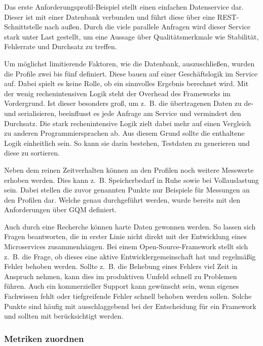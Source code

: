 Das erste Anforderungsprofil-Beispiel stellt einen einfachen Datenservice dar. Dieser ist mit einer Datenbank verbunden und führt diese über eine \ac{REST}-Schnittstelle nach außen. Durch die viele parallele Anfragen wird dieser Service stark unter Last gestellt, um eine Aussage über Qualitätsmerkmale wie Stabilität, Fehlerrate und Durchsatz zu treffen.

Um möglichst limitierende Faktoren, wie die Datenbank, auszuschließen, wurden die Profile zwei bis fünf definiert. Diese bauen auf einer Geschäftslogik im Service auf. Dabei spielt es keine Rolle, ob ein sinnvolles Ergebnis berechnet wird. Mit der wenig rechenintensiven Logik steht der Overhead des Frameworks im Vordergrund. Ist dieser besonders groß, um z.~B. die übertragenen Daten zu de- und serialisieren, beeinflusst es jede Anfrage am Service und vermindert den Durchsatz. Die stark rechenintensive Logik zielt dabei mehr auf einen Vergleich zu anderen Programmiersprachen ab. Aus diesem Grund sollte die enthaltene Logik einheitlich sein. So kann sie darin bestehen, Testdaten zu generieren und diese zu sortieren.

Neben dem reinen Zeitverhalten können an den Profilen noch weitere Messwerte erhoben werden. Dies kann z.~B. Speicherbedarf in Ruhe sowie bei Vollauslastung sein. Dabei stellen die zuvor genannten Punkte nur Beispiele für Messungen an den Profilen dar. Welche genau durchgeführt werden, wurde bereits mit den Anforderungen über \ac{GQM} definiert.


Auch durch eine Recherche können harte Daten gewonnen werden. So lassen sich Fragen beantworten, die in erster Linie nicht direkt mit der Entwicklung eines Microservices zusammenhängen. Bei einem Open-Source-Framework stellt sich z.~B. die Frage, ob dieses eine aktive Entwicklergemeinschaft hat und regelmäßig Fehler behoben werden. Sollte z.~B. die Behebung eines Fehlers viel Zeit in Anspruch nehmen, kann dies im produktiven Umfeld schnell zu Problemen führen. Auch ein kommerzieller Support kann gewünscht sein, wenn eigenes Fachwissen fehlt oder tiefgreifende Fehler schnell behoben werden sollen. Solche Punkte sind häufig mit ausschlaggebend bei der Entscheidung für ein Framework und sollten mit berücksichtigt werden.

\subsubsection{Metriken zuordnen}\label{Metriken_zuordnen}


